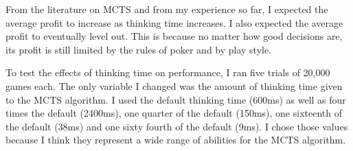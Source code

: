 



From the literature on MCTS and from my experience so far, I expected the average profit to increase as thinking time increases. I also expected the average profit to eventually level out. This is because no matter how good \mbts decisions are, its profit is still limited by the rules of poker and by \sbts play style. 

To test the effects of thinking time on performance, I ran five trials of 20,000 games each. The only variable I changed was the amount of thinking time given to the MCTS algorithm. 
I used the default thinking time (600ms) as well as four times the default (2400ms), one quarter of the default (150ms), one sixteenth of the default (38ms) and one sixty fourth of the default (9ms). I chose those values because I think they represent a wide range of abilities for the MCTS algorithm. 

